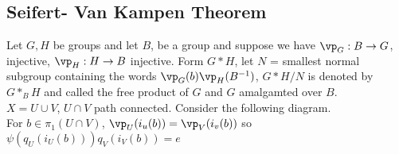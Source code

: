 
\subsection{Seifert- Van Kampen Theorem}

Let $G, H$ be groups and let $B$, be a group and suppose we have $\vp_G: B \to G$, injective, $\vp_H: H \to B$ injective. Form $G*H$, let $N$ = smallest normal subgroup containing the words $\vp_G(b)\vp_H(B^{-1})$, $G*H/N$ is denoted by $G*_BH$ and called the free product of $G$ and $G$ amalgamted over $B$. \\

\noindent
$X = U \cup V$, $U \cap V$ path connected. Consider the following diagram. \\

For $b \in \pi_1(U \cap V)$, $\vp_U(i_u(b)) = \vp_V(i_v(b))$ so $\psi(q_U(i_U(b)))q_V(i_V(b))=e$